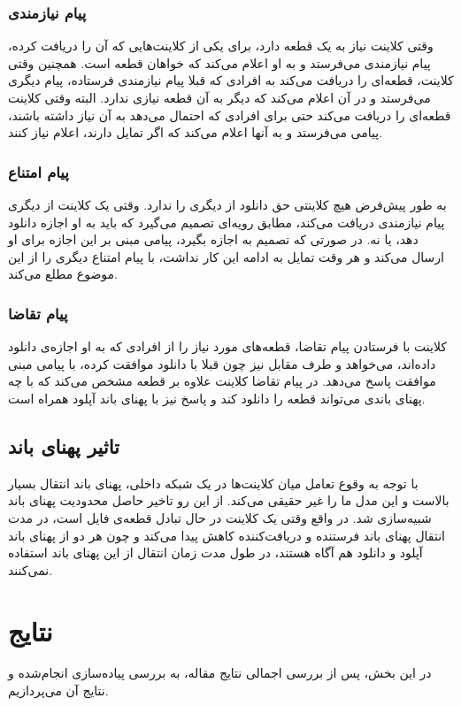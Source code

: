 \documentclass{report}
\begin{document}
\subsubsection{پیام نیازمندی}
وقتی کلاینت نیاز به یک قطعه دارد، برای یکی از کلاینت‌هایی که آن را دریافت کرده، پیام نیازمندی می‌فرستد و به او اعلام می‌کند که خواهان قطعه است. همچنین وقتی کلاینت، قطعه‌ای را دریافت می‌کند به افرادی که قبلا پیام نیازمندی فرستاده، پیام دیگری می‌فرستد و در آن اعلام می‌کند که دیگر به آن قطعه نیازی ندارد. البته وقتی کلاینت قطعه‌ای را دریافت می‌کند حتی برای افرادی که احتمال می‌دهد به آن نیاز داشته باشند، پیامی می‌فرستد و به آنها اعلام می‌کند که اگر تمایل دارند، اعلام نیاز کنند.

\subsubsection{پیام امتناع}
به طور پیش‌فرض هیچ کلاینتی حق دانلود از دیگری را ندارد. وقتی یک کلاینت از دیگری پیام نیازمندی دریافت می‌کند، مطابق رویه‌ای تصمیم می‌گیرد که باید به او اجازه دانلود دهد، یا نه. در صورتی که تصمیم به اجازه بگیرد، پیامی مبنی بر این اجازه برای او ارسال می‌کند و هر وقت تمایل به ادامه این کار نداشت، با پیام امتناع دیگری را از این موضوع مطلع می‌کند.

\subsubsection{پیام تقاضا}
کلاینت با فرستادن پیام تقاضا، قطعه‌های مورد نیاز را از افرادی که به او اجازه‌ی دانلود داده‌اند، می‌خواهد و طرف مقابل نیز چون قبلا با دانلود موافقت کرده، با پیامی مبنی موافقت پاسخ می‌دهد. در پیام تقاضا کلاینت علاوه بر قطعه مشخص می‌کند که با چه پهنای باندی می‌تواند قطعه را دانلود کند و پاسخ نیز با پهنای باند آپلود همراه است.

\subsection{تاثیر پهنای باند}
با توجه به وقوع تعامل میان کلاینت‌ها در یک شبکه داخلی، پهنای باند انتقال بسیار بالاست و این مدل ما را غیر حقیقی می‌کند. از این رو تاخیر حاصل محدودیت پهنای باند شبیه‌سازی شد. در واقع وقتی یک کلاینت در حال تبادل قطعه‌ی فایل است، در مدت انتقال پهنای باند فرستنده و دریافت‌کننده کاهش پیدا می‌کند و چون هر دو از پهنای باند آپلود و دانلود هم آگاه هستند، در طول مدت زمان انتقال از این پهنای باند استفاده نمی‌کنند.

\section{نتایج} 
در این بخش، پس از بررسی اجمالی نتایج مقاله، به بررسی پیاده‌سازی انجام‌شده و نتایج آن می‌پردازیم.
\end{document}
